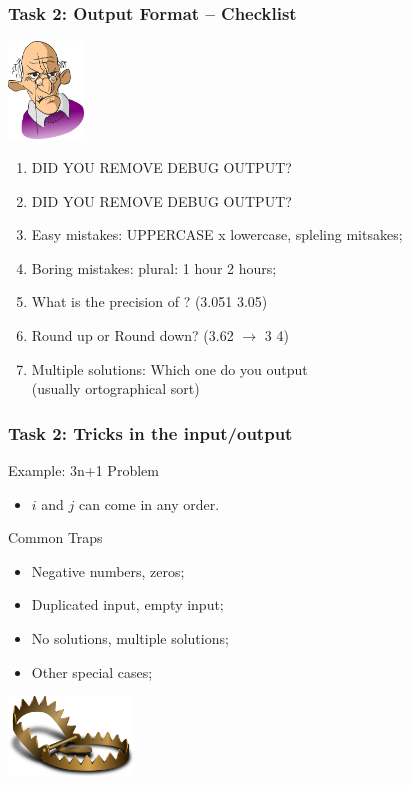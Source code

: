 \begin{frame}
  \frametitle{Task 2: Output Format -- Checklist}

  \includegraphics[width=0.15\textwidth]{../img/angryclient}
  \begin{enumerate}
    \item DID YOU REMOVE DEBUG OUTPUT?
    \item DID YOU REMOVE DEBUG OUTPUT?
    \smallskip

    \item Easy mistakes: UPPERCASE x lowercase, spleling mitsakes;
    \item Boring mistakes: plural: 1 hour  2 hours;
    \item What is the precision of ? (3.051  3.05)
    \item Round up or Round down? (3.62 $\rightarrow$ 3  4)
    \item Multiple solutions: Which one do you output\\ (usually ortographical sort)
  \end{enumerate}
\end{frame}


\begin{frame}
  \frametitle{Task 2: Tricks in the input/output}

  \begin{block}{Example: 3n+1 Problem}
    \begin{itemize}
    \item $i$ and $j$ can come in any order.
    \end{itemize}
  \end{block}

  \begin{block}{Common Traps}
    \begin{itemize}
    \item Negative numbers, zeros;
    \item Duplicated input, empty input;
    \item No solutions, multiple solutions;
    \item Other special cases;
    \end{itemize}
  \end{block}
  \vfill

  \hfill \includegraphics[width=0.25\textwidth]{../img/trap}
\end{frame}

